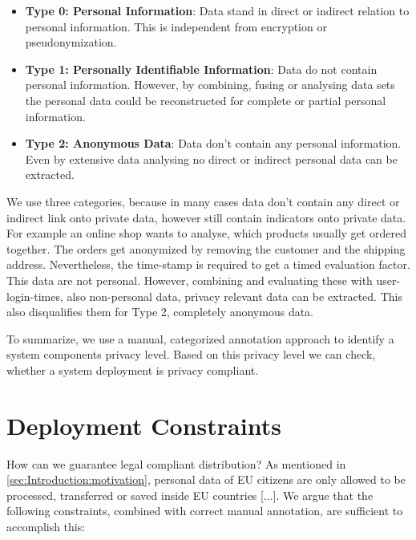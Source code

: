 \begin{itemize}
	\item \textbf{Type 0: Personal Information}: Data stand in direct or indirect relation to personal information. This is independent from encryption or pseudonymization.
	
	\item \textbf{Type 1: Personally Identifiable Information}:  Data do not contain personal information. However, by combining, fusing or analysing data sets the personal data could be reconstructed for complete or partial personal information.
	
	\item \textbf{Type 2: Anonymous Data}: Data don't contain any personal information. Even by extensive data analysing no direct or indirect personal data can be extracted.
	
	\label{sec:PrivacyConcept:dataprivacylevel}
\end{itemize}

We use three categories, because in many cases data don't contain any direct or indirect link onto private data, however still contain indicators onto private data. For example an online shop wants to analyse, which products usually get ordered together. The orders get anonymized by removing the customer and the shipping address. Nevertheless, the time-stamp is required to get a timed evaluation factor. This data are not personal. However, combining and evaluating these with user-login-times, also non-personal data, privacy relevant data can be extracted. This also disqualifies them for Type 2, completely anonymous data. \cite{Schmieders.}\cite{Schmieders.2015}

To summarize, we use a manual, categorized annotation approach to identify a system components privacy level. Based on this privacy level we can check, whether a system deployment is privacy compliant.


\section{Deployment Constraints}
\label{sec:PrivacyConcept:deploymentrules}

How can we guarantee legal compliant distribution? As mentioned in \autoref{sec:Introduction:motivation}, personal data of EU citizens are only allowed to be processed, transferred or saved inside EU countries [...]. We argue that the following constraints, combined with correct manual annotation, are sufficient to accomplish this:

